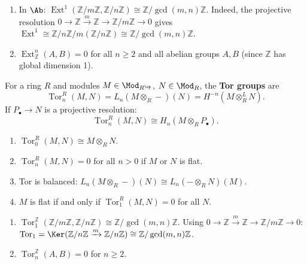 \begin{example}\label{ex:ext-computations}
\begin{enumerate}
    \item{}
    In $\Ab$: $\operatorname{Ext}^1(\mathbb{Z}/m\mathbb{Z}, \mathbb{Z}/n\mathbb{Z})
    \cong \mathbb{Z}/\gcd(m,n)\mathbb{Z}$.
    Indeed, the projective resolution $0 \to \mathbb{Z} \xrightarrow{m} \mathbb{Z} \to \mathbb{Z}/m\mathbb{Z} \to 0$
    gives $\operatorname{Ext}^1 \cong \mathbb{Z}/n\mathbb{Z} \big/ m(\mathbb{Z}/n\mathbb{Z})
    \cong \mathbb{Z}/\gcd(m,n)\mathbb{Z}$.
    \item $\operatorname{Ext}^n_{\mathbb{Z}}(A, B) = 0$ for all $n \geq 2$ and all
    abelian groups $A, B$ (since $\mathbb{Z}$ has global dimension 1).
\end{enumerate}
\end{example}

\begin{definition}\label{def:tor}
For a ring $R$ and modules $M \in \Mod_{R^{\op}}$, $N \in \Mod_R$, the \textbf{Tor groups} are
\[
    \operatorname{Tor}_n^R(M, N) = L_n(M \otimes_R -)(N) = H^{-n}(M \otimes_R^L N).
\]
If $P_\bullet \to N$ is a projective resolution:
\[
    \operatorname{Tor}_n^R(M, N) \cong H_n(M \otimes_R P_\bullet).
\]
\end{definition}

\begin{proposition}\label{prop:tor-properties}
\begin{enumerate}
    \item $\operatorname{Tor}_0^R(M, N) \cong M \otimes_R N$.
    \item $\operatorname{Tor}_n^R(M, N) = 0$ for all $n > 0$ if $M$ or $N$ is flat.
    \item Tor is balanced: $L_n(M \otimes_R -)(N) \cong L_n(- \otimes_R N)(M)$.
    \item $M$ is flat if and only if $\operatorname{Tor}_1^R(M, N) = 0$ for all $N$.
\end{enumerate}
\end{proposition}

\begin{example}\label{ex:tor-computations}
\begin{enumerate}
    \item{}
    $\operatorname{Tor}_1^{\mathbb{Z}}(\mathbb{Z}/m\mathbb{Z}, \mathbb{Z}/n\mathbb{Z})
    \cong \mathbb{Z}/\gcd(m,n)\mathbb{Z}$.
    Using $0 \to \mathbb{Z} \xrightarrow{m} \mathbb{Z} \to \mathbb{Z}/m\mathbb{Z} \to 0$:
    $\operatorname{Tor}_1 = \Ker(\mathbb{Z}/n\mathbb{Z} \xrightarrow{m} \mathbb{Z}/n\mathbb{Z})
    \cong \mathbb{Z}/\gcd(m,n)\mathbb{Z}$.
    \item $\operatorname{Tor}_n^{\mathbb{Z}}(A, B) = 0$ for $n \geq 2$.
\end{enumerate}
\end{example}


